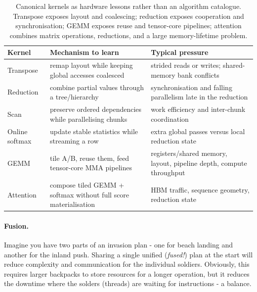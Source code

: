 \begin{table}[H]
\centering
\small
\caption{Canonical kernels as hardware lessons rather than an algorithm catalogue.
Transpose exposes layout and coalescing; reduction exposes cooperation and synchronisation; GEMM exposes reuse and tensor-core pipelines; attention combines matrix operations, reductions, and a large memory-lifetime problem.}
\label{tab:kernel-patterns}
\begin{tabularx}{\textwidth}{@{}>{\raggedright\arraybackslash}p{2.05cm}>{\raggedright\arraybackslash}X>{\raggedright\arraybackslash}X@{}}
\toprule
\textbf{Kernel} & \textbf{Mechanism to learn} & \textbf{Typical pressure} \\
\midrule
Transpose & remap layout while keeping global accesses coalesced & strided reads or writes; shared-memory bank conflicts \\
Reduction & combine partial values through a tree/hierarchy & synchronisation and falling parallelism late in the reduction \\
Scan & preserve ordered dependencies while parallelising chunks & work efficiency and inter-chunk coordination \\
Online softmax & update stable statistics while streaming a row & extra global passes versus local reduction state \\
GEMM & tile A/B, reuse them, feed tensor-core MMA pipelines & registers/shared memory, layout, pipeline depth, compute throughput \\
Attention & compose tiled GEMM + softmax without full score materialisation & HBM traffic, sequence geometry, reduction state \\
\bottomrule
\end{tabularx}
\end{table}

\paragraph{Fusion.}
Imagine you have two parts of an invasion plan - one for beach landing and another for the inland push.
Sharing a single unified (\textit{fused!}) plan at the start will reduce complexity and communication for the individual soldiers. 
Obviously, this requires larger backpacks to store resources for a longer operation, but it reduces the downtime where the solders (threads) are waiting for instructions - a balance.

